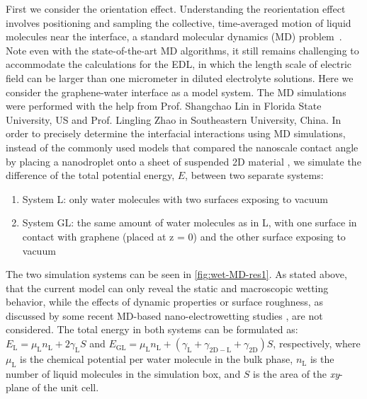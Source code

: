 First we consider the orientation effect. Understanding the
reorientation effect involves positioning and sampling the collective,
time-averaged motion of liquid molecules near the interface, a
standard molecular dynamics (MD)
problem~\autocite{Israelachvili_2011_book}.
%
Note even with the
state-of-the-art MD algorithms, it still remains challenging to accommodate
the calculations for the EDL, in which the length scale of electric
field can be larger than one micrometer in diluted electrolyte
solutions.
Here we consider the graphene-water interface as a model system. The
MD simulations were performed with the help from Prof. Shangchao Lin
in Florida State University, US and Prof. Lingling Zhao in
Southeastern University, China.
%
In order to precisely determine the interfacial interactions using MD
simulations, instead of the commonly used models that compared the
nanoscale contact angle by placing a nano\-droplet onto a sheet of
suspended 2D material
\autocite{Ostrowski_2014_tunable,Daub_2007_nanoscale_EW,Ren_2015_interfacial,Taherian_2015_asym_EW},
we simulate the difference of the total potential energy,
\(E\), between two separate systems:
\begin{enumerate}
\item System L: only water molecules with two surfaces exposing to vacuum
  
\item System GL: the same amount of water molecules as in L, with one
  surface in contact with graphene (placed at z = 0) and the other
  surface exposing to vacuum
\end{enumerate}
%
The two simulation systems can be seen in \autoref{fig:wet-MD-res1}.
%
As stated above, that the current model can only reveal the static and
macroscopic wetting behavior, while the effects of dynamic properties
or surface roughness, as discussed by some recent MD-based
nano-electrowetting studies \autocite{Yuan_2010_PF,Zhao_2015_pillar}, are
not considered.
%
The total energy in both systems
can be formulated as:
\(E_{\mathrm{L}} = \mu_{\mathrm{L}}n_{\mathrm{L}} +
2\gamma_{\mathrm{L}}S\) and
\(E_{\mathrm{GL}}=\mu_{\mathrm{L}}n_{\mathrm{L}}+(\gamma_{\mathrm{L}}
+ \gamma_{\mathrm{2D-L}} + \gamma_{\mathrm{2D}})S\), respectively,
where \(\mu_{\mathrm{L}}\) is the chemical potential per water
molecule in the bulk phase, \(n_{\mathrm{L}}\) is the number of liquid
molecules in the simulation box, and \(S\) is the area of the 
\emph{xy}-plane of the unit cell.
